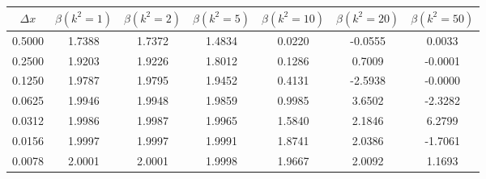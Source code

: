 \begin{tabular}{|c|c|c|c|c|c|c|}
\hline
\textbf{$\Delta x$}&\textbf{$\beta(k^2=1)$}&\textbf{$\beta(k^2=2)$}&\textbf{$\beta(k^2=5)$}&\textbf{$\beta(k^2=10)$}&\textbf{$\beta(k^2=20)$}&\textbf{$\beta(k^2=50)$}\\\hline
0.5000&1.7388&1.7372&1.4834&0.0220&-0.0555&0.0033\\\hline
0.2500&1.9203&1.9226&1.8012&0.1286&0.7009&-0.0001\\\hline
0.1250&1.9787&1.9795&1.9452&0.4131&-2.5938&-0.0000\\\hline
0.0625&1.9946&1.9948&1.9859&0.9985&3.6502&-2.3282\\\hline
0.0312&1.9986&1.9987&1.9965&1.5840&2.1846&6.2799\\\hline
0.0156&1.9997&1.9997&1.9991&1.8741&2.0386&-1.7061\\\hline
0.0078&2.0001&2.0001&1.9998&1.9667&2.0092&1.1693\\\hline
\end{tabular}
